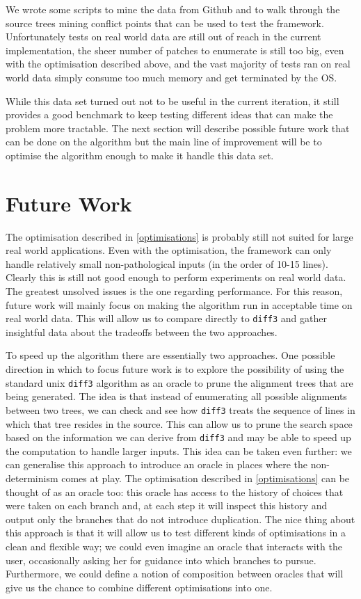 \documentclass[11pt]{article}
\begin{document}
We wrote some scripts to mine the data from Github and to walk through the 
source trees mining conflict points that can be used to test the framework. 
Unfortunately tests on real world data are still out of reach in the current 
implementation, the sheer number of patches to enumerate is still too big, even 
with the optimisation described above, and the vast majority of tests ran on 
real world data simply consume too much memory and get terminated by the OS.

While this data set turned out not to be useful in the current iteration, it 
still provides a good benchmark to keep testing different ideas that can make 
the problem more tractable. The next section will describe possible future work 
that can be done on the algorithm but the main line of improvement will be to 
optimise the algorithm enough to make it handle this data set.

\section{Future Work}\label{future work}
The optimisation described in \ref{optimisations} is probably still not suited 
for large real world applications. Even with the optimisation, the framework can only handle relatively small 
non-pathological inputs (in the order of 10-15 lines). Clearly this is still not good enough to perform experiments
on real world data. 
The greatest unsolved issues is the one regarding performance. For this reason, future work will mainly focus
on making the algorithm run in acceptable time on real world data. This will allow us to compare directly to \texttt{diff3}
and gather insightful data about the tradeoffs between the two approaches. 

To speed up the algorithm there are essentially two approaches. 
One possible direction in which to focus future work is to explore the 
possibility of using the standard unix \texttt{diff3} algorithm as an oracle to prune the 
alignment trees that are being generated. 
The idea is that instead of enumerating all possible alignments between two 
trees, we can check and see how \texttt{diff3} treats the sequence of lines in which that 
tree resides in the source. This can allow us to prune the search space based on 
the information we can derive from \texttt{diff3} and may be able to speed up 
the computation to handle larger inputs. This idea can be taken even further: we 
can generalise this approach to introduce an oracle in places where the non-determinism 
comes at play. The optimisation described in \ref{optimisations} can be thought of as an oracle too: 
this oracle has access to the history of choices that were taken on each branch and, at each step it will
inspect this history and output only the branches that do not introduce duplication.
The nice thing about this approach is that it will allow us to test different 
kinds of optimisations in a clean and flexible way; we could even imagine an oracle that interacts with the 
user, occasionally asking her for guidance into which branches to pursue. 
Furthermore, we could define a notion of composition between oracles that will give us the chance to combine different 
optimisations into one.
\end{document}
